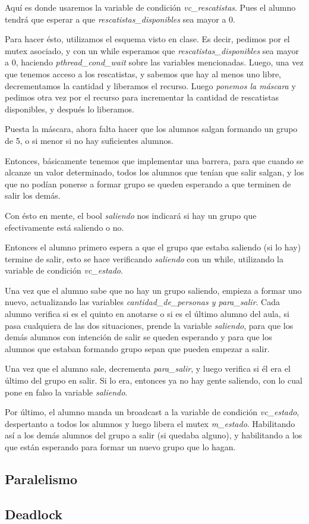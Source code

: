 \documentclass[a4paper]{article}
\begin{document}
Aquí es donde usaremos la variable de condición \textit{vc\_rescatistas}.
Pues el alumno tendrá que esperar a que \textit{rescatistas\_disponibles}
sea mayor a $0$.

Para hacer ésto, utilizamos el esquema visto en clase. Es decir, pedimos por
el mutex asociado, y con un while esperamos que
\textit{rescatistas\_disponibles} sea mayor a $0$, haciendo
\textit{pthread\_cond\_wait} sobre las variables mencionadas. Luego, una vez
que tenemos acceso a los rescatistas, y sabemos que hay al menos uno libre,
decrementamos la cantidad y liberamos el recurso. Luego \textit{ponemos la
máscara} y pedimos otra vez por el recurso para incrementar la cantidad de
rescatistas disponibles, y después lo liberamos.

Puesta la máscara, ahora falta hacer que los alumnos salgan formando un
grupo de 5, o si menor si no hay suficientes alumnos.

Entonces, básicamente tenemos que implementar una barrera, para que cuando
se alcanze un valor determinado, todos los alumnos que tenían que salir
salgan, y los que no podían ponerse a formar grupo se queden esperando a que
terminen de salir los demás.

Con ésto en mente, el bool \textit{saliendo} nos indicará si hay un grupo
que efectivamente está saliendo o no.

Entonces el alumno primero espera a que el grupo que estaba saliendo (si lo
hay) termine de salir, esto se hace verificando \textit{saliendo} con un
while, utilizando la variable de condición \textit{vc\_estado}. 

Una vez que el alumno sabe que no hay un grupo saliendo, empieza a formar uno
nuevo, actualizando las variables \textit{cantidad\_de\_personas y
para\_salir}. Cada alumno verifica si es el quinto en anotarse o si es el
último alumno del aula, si pasa cualquiera de las dos situaciones,
prende la variable \textit{saliendo}, para que los demás alumnos con
intención de salir se queden esperando y para que los alumnos que estaban
formando grupo sepan que pueden empezar a salir.

Una vez que el alumno sale, decrementa \textit{para\_salir}, y luego
verifica si él era el último del grupo en salir. Si lo era, entonces ya no
hay gente saliendo, con lo cual pone en falso la variable \textit{saliendo}.

Por último, el alumno manda un broadcast a la variable de condición
\textit{vc\_estado}, despertanto a todos los alumnos y luego libera el mutex
\textit{m\_estado}. Habilitando así a los demás alumnos del grupo a salir
(si quedaba alguno), y habilitando a los que están esperando para formar un
nuevo grupo que lo hagan.



\subsection{Paralelismo}

\subsection{Deadlock}
\end{document}
